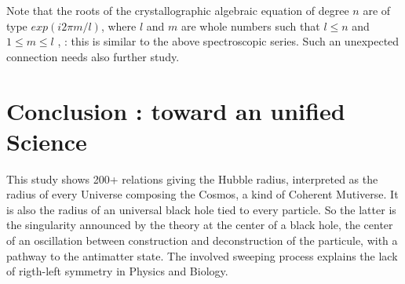 \documentclass[a4paper,9pt]{article}
\begin{document}
    Note that the roots of the crystallographic algebraic equation of degree $n$ are of type $exp(i2\pi m/l)$, where $l$ and $m$ are whole numbers such that $ l \leq n $ and $ 1 \leq m \leq l $ ,  : this is similar to the above spectroscopic series. Such an unexpected connection needs also further study.   







    





\section{Conclusion : toward an unified Science}

This study shows 200+ relations giving the Hubble radius, interpreted as the radius of every Universe composing the Cosmos, a kind of Coherent Mutiverse. It is also the radius of an universal black hole tied to every particle. So the latter is the singularity announced by the theory at the center of a black hole, the center of an oscillation between construction and deconstruction of the particule, with a pathway to the antimatter state. The involved sweeping process explains the lack of rigth-left symmetry  in Physics and Biology.
\end{document}
